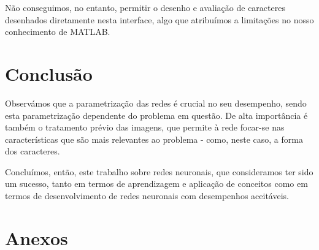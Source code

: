 \documentclass[11pt]{article}
\begin{document}
	Não conseguimos, no entanto, permitir o desenho e avaliação de caracteres desenhados diretamente nesta interface, algo que atribuímos a limitações no nosso conhecimento de MATLAB.
	
	\large
	\section{Conclusão}
	\normalsize
	
	Observámos que a parametrização das redes é crucial no seu desempenho, sendo esta parametrização dependente do problema em questão. De alta importância é também o tratamento prévio das imagens, que permite à rede focar-se nas características que são mais relevantes ao problema - como, neste caso, a forma dos caracteres.
	
	Concluímos, então, este trabalho sobre redes neuronais, que consideramos ter sido um sucesso, tanto em termos de aprendizagem e aplicação de conceitos como em termos de desenvolvimento de redes neuronais com desempenhos aceitáveis.
	
	
	\pagebreak
	
	\large
	\section{Anexos}

	\normalsize
	\listoffigures
\end{document}
